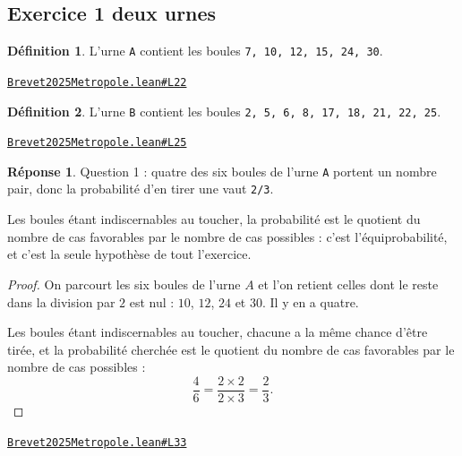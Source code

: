 \documentclass[11pt,a4paper]{article}
\theoremstyle{definition}
\newtheorem{definition}{Définition}
\theoremstyle{plain}
\theoremstyle{definition}
\newtheorem*{reponse}{Réponse}
\newcommand{\source}[2]{\par\smallskip\noindent\hfill{\footnotesize\href{#1}{\texttt{#2}}}\par\smallskip}
\begin{document}
\subsection{Exercice 1 \textemdash{} deux urnes}

\begin{definition}
L'urne \texttt{A} contient les boules \texttt{7, 10, 12, 15, 24, 30}.
\end{definition}
\source{https://github.com/Commutator-IO/learn-lean/blob/main/exams/2025/Brevet2025Metropole.lean\#L22}{Brevet2025Metropole.lean\#L22}

\begin{definition}
L'urne \texttt{B} contient les boules \texttt{2, 5, 6, 8, 17, 18, 21, 22, 25}.
\end{definition}
\source{https://github.com/Commutator-IO/learn-lean/blob/main/exams/2025/Brevet2025Metropole.lean\#L25}{Brevet2025Metropole.lean\#L25}

\begin{reponse}
Question 1 : quatre des six boules de l'urne \texttt{A} portent un nombre pair, donc
la probabilité d'en tirer une vaut \texttt{2/3}.

Les boules étant indiscernables au toucher, la probabilité est le quotient du
nombre de cas favorables par le nombre de cas possibles : c'est l'équiprobabilité,
et c'est la seule hypothèse de tout l'exercice.
\end{reponse}
\begin{proof}
On parcourt les six boules de l'urne $A$ et l'on retient celles dont le reste dans la
division par $2$ est nul : $10$, $12$, $24$ et $30$. Il y en a quatre.

Les boules étant indiscernables au toucher, chacune a la même chance d'être tirée, et la
probabilité cherchée est le quotient du nombre de cas favorables par le nombre de cas
possibles :
\[ \frac{4}{6} = \frac{2 \times 2}{2 \times 3} = \frac{2}{3} . \]
\end{proof}
\source{https://github.com/Commutator-IO/learn-lean/blob/main/exams/2025/Brevet2025Metropole.lean\#L33}{Brevet2025Metropole.lean\#L33}
\end{document}

